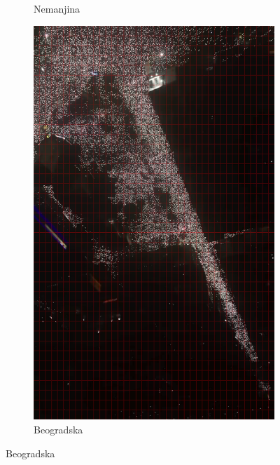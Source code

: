 \documentclass[a4paper,12pt]{article}
\begin{document}
\begin{figure}[H]
\begin{subfigure}[b]{0.3\textwidth}
	  \caption{Nemanjina}
	  \label{fig:nemanjina}
	\end{subfigure}
	\hfill
	\begin{subfigure}[b]{0.3\textwidth}
		\centering
		\includegraphics[width=\textwidth]{../outputs/grid_output/beogradska_grid.png}
		\caption{Beogradska}
		\label{fig:beogradska}
	\end{subfigure}
  
	\vspace{0.3cm} %
  

\end{figure}
\end{document}
